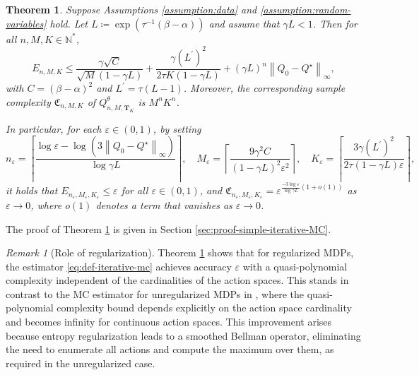\documentclass[11pt]{article}
\numberwithin{equation}{section}
\newtheorem{theorem}{Theorem}[section]
\theoremstyle{definition}
\theoremstyle{remark}
\newtheorem{remark}{Remark}[section]
\def\N{{\mathbb{N}}}
\newcommand{\citet}{\cite}
\begin{document}
\begin{theorem}
\label{thm:simple-iterative-MC}
Suppose    Assumptions \ref{assumption:data} and \ref{assumption:random-variables} hold. 
Let $L \coloneqq \exp \left( \tau^{-1}(\beta - \alpha)\right)$ and 
 assume that $\gamma L<1$.
  Then for all $n, M, K \in \N^*$,  
    \begin{equation}
\label{eq:final-error-simple-iterative-mc}
        E_{n,M,K } \leq \frac{\gamma \sqrt{C}}{\sqrt{M}(1 - \gamma L)} + \frac{\gamma (L^\prime)^2}{2 \tau K(1 - \gamma L)} + (\gamma L)^n  \left\|Q_0 - Q^\star\right\|_{\infty},
    \end{equation}
    with
    $
C = \left(\beta-\alpha \right)^2$ 
and 
$ 
L^\prime = \tau (L - 1)$. Moreover, the  corresponding  sample complexity
$\mathfrak C_{n,M, K}$ of $Q^\theta_{n,M,\mathbf T_K}$
is 
 $M^nK^n$.

 
 In particular, for each 
      $\varepsilon \in (0,1)$,
     by setting 
    \begin{equation}
        \label{eq:n-M-K-simple-iterative-MC}
        n_\varepsilon= \left\lceil \frac{\log \varepsilon - \log (3\left\|Q_0 - Q^\star\right\|_{\infty})}{\log \gamma L}\right\rceil, \quad M_\varepsilon = \left\lceil \frac{9\gamma^2C}{(1-\gamma L)^2\varepsilon^2}\right\rceil, \quad K_\varepsilon = \left\lceil  \frac{3\gamma (L^\prime)^2}{2 \tau(1-\gamma L)\varepsilon}\right\rceil,
    \end{equation}
   it holds that  $E_{n_\varepsilon,M_\varepsilon,K_\varepsilon} \leq \varepsilon$
   for all $\varepsilon\in (0,1)$,
   and 
$\mathfrak C_{n_\varepsilon,M_\varepsilon,K_\varepsilon} = \varepsilon^{ \frac{-3 \log \varepsilon}{\log \gamma L}(1 + o(1))}$ as $\varepsilon\to 0$,
where $o(1)$ denotes a term that vanishes as $\varepsilon\to 0$.
   
\end{theorem}

 The proof of Theorem \ref{thm:simple-iterative-MC} is given in Section \ref{sec:proof-simple-iterative-MC}.
 
 \begin{remark}[Role of regularization]
 Theorem \ref{thm:simple-iterative-MC}
 shows that 
 for regularized MDPs, 
 the  estimator 
\eqref{eq:def-iterative-mc}
achieves accuracy $\varepsilon$ 
with a quasi-polynomial complexity  independent of the cardinalities of the  action spaces.
This stands in contrast to the MC estimator  for unregularized MDPs   in \citet{kearns2002sparse}, where the quasi-polynomial complexity bound  depends explicitly on the action space cardinality and becomes infinity for continuous action spaces.
This improvement arises because entropy regularization leads to a smoothed Bellman operator, eliminating the need to enumerate all actions and compute the maximum over them, as required in the unregularized case.
 \end{remark}
\end{document}
